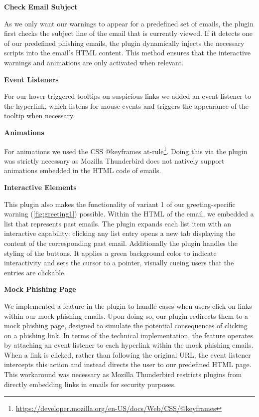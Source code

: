 \documentclass[
  a4paper,  %
  twoside,  %
  bibliography=totoc,
  headsepline,
  cleardoublepage=empty,
  parskip=half,
  draft=false
]{scrbook}
\begin{document}
\textbf{Check Email Subject}

As we only want our warnings to appear for a predefined set of emails, the plugin first checks the subject line of the email that is currently viewed. If it detects one of our predefined phishing emails, the plugin dynamically injects the necessary scripts into the email's HTML content. This method ensures that the interactive warnings and animations are only activated when relevant. 

\textbf{Event Listeners}

For our hover-triggered tooltips on suspicious links we added an event listener to the hyperlink, which listens for mouse events and triggers the appearance of the tooltip when necessary. \newpage

\textbf{Animations}

For animations we used the CSS @keyframes at-rule\footnote{ \href{https://developer.mozilla.org/en-US/docs/Web/CSS/@keyframes}{https://developer.mozilla.org/en-US/docs/Web/CSS/@keyframes}}. Doing this via the plugin was strictly necessary as Mozilla Thunderbird does not natively support animations embedded in the HTML code of emails. 

\textbf{Interactive Elements}

This plugin also makes the functionality of variant 1 of our greeting-specific warning (\ref{fig:greeting1}) possible. Within the HTML of the email, we embedded a list that represents past emails. The plugin expands each list item with an interactive capability: clicking any list entry opens a new tab displaying the content of the corresponding past email. Additionally the plugin handles the styling of the buttons. It applies a green background color to indicate interactivity and sets the cursor to a pointer, visually cueing users that the entries are clickable. 

\textbf{Mock Phishing Page}

We implemented a feature in the plugin to handle cases when users click on links within our mock phishing emails. Upon doing so, our plugin redirects them to a mock phishing page, designed to simulate the potential consequences of clicking on a phishing link. In terms of the technical implementation, the feature operates by attaching an event listener to each hyperlink within the mock phishing emails. When a link is clicked, rather than following the original URL, the event listener intercepts this action and instead directs the user to our predefined HTML page. This workaround was necessary as Mozilla Thunderbird restricts plugins from directly embedding links in emails for security purposes.
\end{document}
